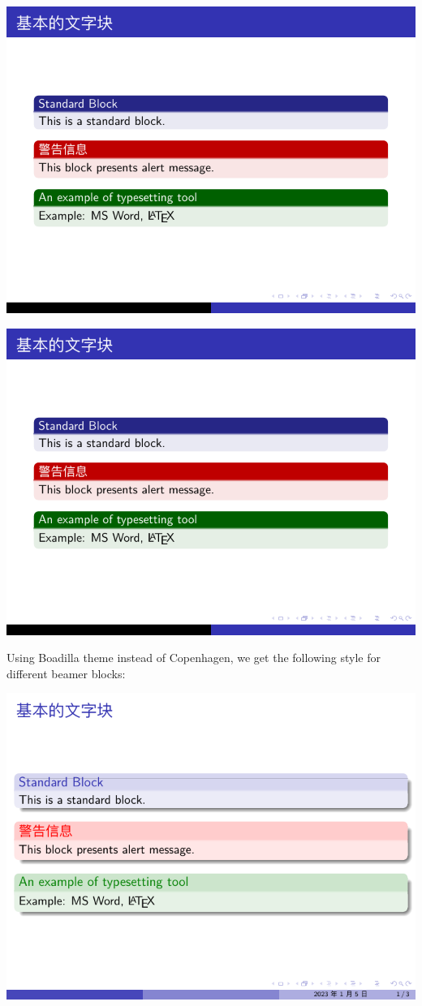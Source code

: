 \includegraphics[page=2]{examples/beamer/block-styles1.pdf}

\includegraphics[page=3]{examples/beamer/block-styles1.pdf}

Using {\ttfamily Boadilla} theme instead of {\ttfamily Copenhagen}, we get the following style for different beamer blocks:

\includegraphics[page=1]{examples/beamer/block-styles2.pdf}

